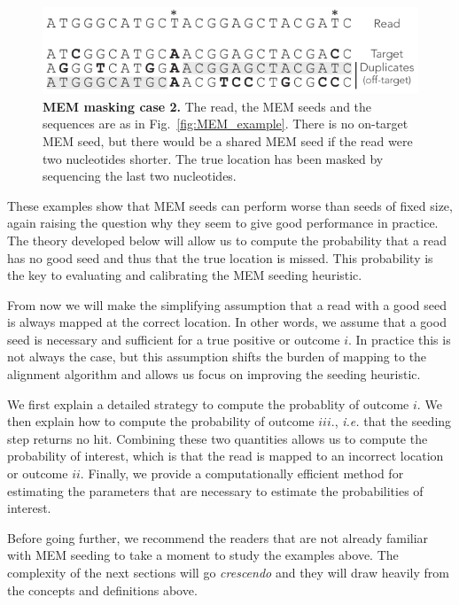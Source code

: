 \documentclass{article}
\begin{document}
\begin{figure}[h]
\centering
\includegraphics[scale=1]{short_vs_long_example.pdf}
\caption{\textbf{MEM masking case 2.}
The read, the MEM seeds and the sequences are as in
Fig.~\ref{fig:MEM_example}. There is no on-target MEM seed, but there
would be a shared MEM seed if the read were two nucleotides shorter. The
true location has been masked by sequencing the last two nucleotides.}
\label{fig:short_vs_long}
\end{figure}

These examples show that MEM seeds can perform worse than seeds of fixed
size, again raising the question why they seem to give good performance in
practice. The theory developed below will allow us to compute the
probability that a read has no good seed and thus that the true location
is missed. This probability is the key to evaluating and calibrating the
MEM seeding heuristic.

From now we will make the simplifying assumption that a read with a good
seed is always mapped at the correct location. In other words, we assume
that a good seed is necessary and sufficient for a true positive or
outcome $i.$ In practice this is not always the case, but this assumption
shifts the burden of mapping to the alignment algorithm and allows us
focus on improving the seeding heuristic.

We first explain a detailed strategy to compute the probablity of outcome
$i.$ We then explain how to compute the probability of outcome $iii.$,
\textit{i.e.} that the seeding step returns no hit. Combining these two
quantities allows us to compute the probability of interest, which is that
the read is mapped to an incorrect location or outcome $ii.$ Finally, we
provide a computationally efficient method for estimating the parameters
that are necessary to estimate the probabilities of interest.

Before going further, we recommend the readers that are not already
familiar with MEM seeding to take a moment to study the examples above.
The complexity of the next sections will go \textit{crescendo} and they
will draw heavily from the concepts and definitions above.
\end{document}
